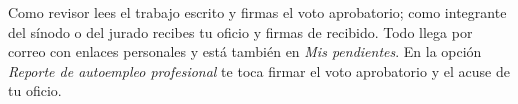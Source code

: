 \documentclass[11pt,a4paper]{article}
\begin{document}
{\small\tableofcontents}
\newpage
\begin{quevasahacer}
Como revisor lees el trabajo escrito y firmas el voto aprobatorio; como integrante del sínodo o del jurado recibes tu oficio y firmas de recibido. Todo llega por correo con enlaces personales y está también en \emph{Mis pendientes}. En la opción \emph{Reporte de autoempleo profesional} te toca firmar el voto aprobatorio y el acuse de tu oficio.
\end{quevasahacer}



\end{document}
